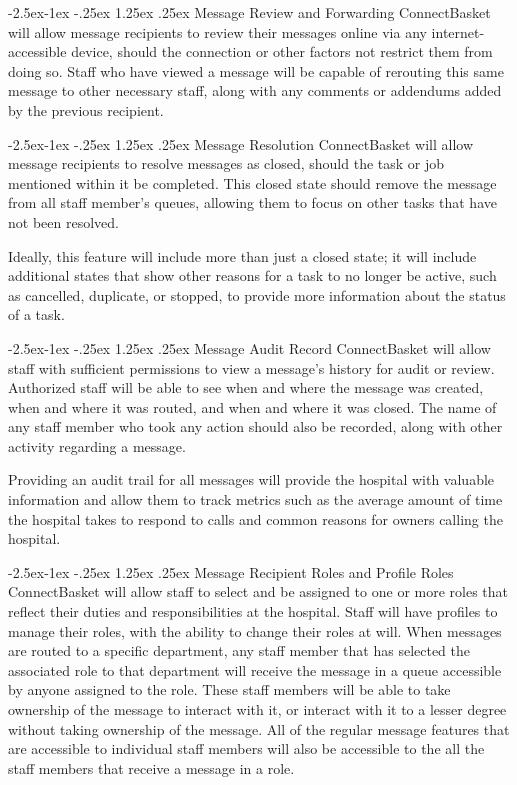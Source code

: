 \documentclass[onecolumn, draftclsnofoot,10pt, compsoc]{IEEEtran}
\makeatletter
\renewcommand\paragraph{\@startsection{paragraph}{4}{\z@}%
            {-2.5ex\@plus -1ex \@minus -.25ex}%
            {1.25ex \@plus .25ex}%
            {\normalfont\normalsize\bfseries}}
\makeatother
\begin{document}
\paragraph{Message Review and Forwarding}
ConnectBasket will allow message recipients to review their messages online via any internet-accessible device, should the connection or other factors not restrict them from doing so. Staff who have viewed a message will be capable of rerouting this same message to other necessary staff, along with any comments or addendums added by the previous recipient. 

\paragraph{Message Resolution}
ConnectBasket will allow message recipients to resolve messages as closed, should the task or job mentioned within it be completed. This closed state should remove the message from all staff member's queues, allowing them to focus on other tasks that have not been resolved.
	
Ideally, this feature will include more than just a closed state; it will include additional states that show other reasons for a task to no longer be active, such as cancelled, duplicate, or stopped, to provide more information about the status of a task.

\paragraph{Message Audit Record}
ConnectBasket will allow staff with sufficient permissions to view a message's  history for audit or review. Authorized staff will  be able to see when and where the message was created, when and where it was routed, and when and where it was closed. The name of any staff member who took any action should also be recorded, along with other activity regarding a message. 

Providing an audit trail for all messages will provide the hospital with valuable information and allow them to track metrics such as the average amount of time the hospital takes to respond to calls and common reasons for owners calling the hospital. 

\paragraph{Message Recipient Roles and Profile Roles}
ConnectBasket will allow staff to select and be assigned to one or more roles that reflect their duties and responsibilities at the hospital. Staff will have profiles to manage their roles, with the ability to change their roles at will. When messages are routed to a specific department, any staff member that has selected the associated role to that department will receive the message in a queue accessible by anyone assigned to the role. These staff members will be able to take ownership of the message to interact with it, or interact with it to a lesser degree without taking ownership of the message. All of the regular message features that are accessible to individual staff members will also be accessible to the all the staff members that receive a message in a role. 
\end{document}

